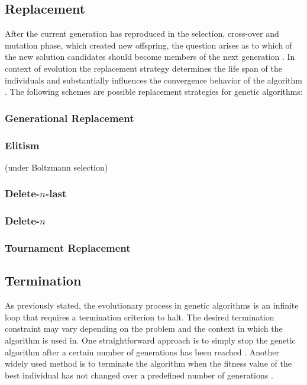 \documentclass[sigconf]{acmart}
\begin{document}
\subsection{Replacement}
After the current generation has reproduced in the selection, cross-over and
mutation phase, which created new offspring, the question arises as to which
of the new solution candidates should become members of the next generation
\cite{Affenzeller2009}. In context of evolution the replacement strategy
determines the life span of the individuals and substantially influences
the convergence behavior of the algorithm \cite{Affenzeller2009}.
The following schemes are possible replacement strategies for genetic
algorithms:

\subsubsection{Generational Replacement}
\cite{Affenzeller2009}

\subsubsection{Elitism}
\cite{Affenzeller2009}
\cite{Katoch2021} (under Boltzmann selection)

\subsubsection{Delete-$n$-last}
\cite{Affenzeller2009}

\subsubsection{Delete-$n$}
\cite{Affenzeller2009}

\subsubsection{Tournament Replacement}
\cite{Affenzeller2009}


\subsection{Termination}
As previously stated, the evolutionary process in genetic algorithms is
an infinite loop that requires a termination criterion to halt.
The desired termination constraint may vary depending on the problem and the
context in which the algorithm is used in.
One straightforward approach is to simply stop the genetic algorithm after a
certain number of generations has been reached \cite{Beligiannis2009}.
Another widely used method is to terminate the algorithm when the fitness value
of the best individual has not changed over a predefined number of
generations \cite{Carr2014}.
\end{document}
